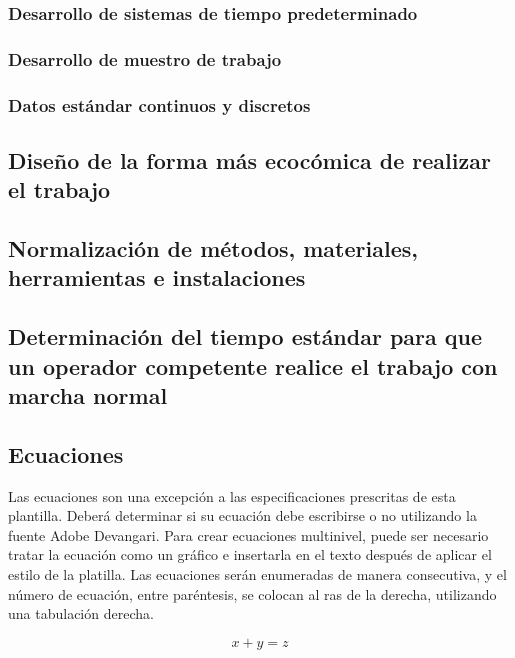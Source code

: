     \subsubsection{Desarrollo de sistemas de tiempo predeterminado}
    \subsubsection{Desarrollo de muestro de trabajo}
    \subsubsection{Datos estándar continuos y discretos}
    \subsection{Diseño de la forma más ecocómica de realizar el trabajo}
    \subsection{Normalización de métodos, materiales, herramientas e instalaciones}
    \subsection{Determinación del tiempo estándar para que un operador competente realice el trabajo con marcha normal}
    
    
    
    
    

    

    
    \subsection{Ecuaciones}
    
    Las ecuaciones son una excepción a las especificaciones prescritas de esta plantilla. 
    Deberá determinar si su ecuación debe escribirse o no utilizando la fuente Adobe Devangari. 
    Para crear ecuaciones multinivel, puede ser necesario tratar la ecuación como un gráfico e insertarla en el texto después de aplicar el estilo de la platilla.
    Las ecuaciones serán enumeradas de manera consecutiva, y el número de ecuación, entre paréntesis, se colocan al ras de la derecha, utilizando una tabulación derecha. 
    
    \begin{equation}
        \label{eq1}
        x + y = z 
    \end{equation}
    
